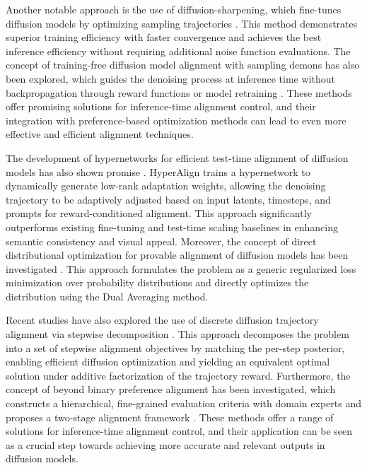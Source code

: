 \documentclass[11pt,a4paper]{article}
\begin{document}
Another notable approach is the use of diffusion-sharpening, which fine-tunes diffusion models by optimizing sampling trajectories \cite{arxiv:2502.12146}. This method demonstrates superior training efficiency with faster convergence and achieves the best inference efficiency without requiring additional noise function evaluations. The concept of training-free diffusion model alignment with sampling demons has also been explored, which guides the denoising process at inference time without backpropagation through reward functions or model retraining \cite{arxiv:2410.05760}. These methods offer promising solutions for inference-time alignment control, and their integration with preference-based optimization methods can lead to even more effective and efficient alignment techniques.

The development of hypernetworks for efficient test-time alignment of diffusion models has also shown promise \cite{arxiv:2601.15968}. HyperAlign trains a hypernetwork to dynamically generate low-rank adaptation weights, allowing the denoising trajectory to be adaptively adjusted based on input latents, timesteps, and prompts for reward-conditioned alignment. This approach significantly outperforms existing fine-tuning and test-time scaling baselines in enhancing semantic consistency and visual appeal. Moreover, the concept of direct distributional optimization for provable alignment of diffusion models has been investigated \cite{arxiv:2502.02954}. This approach formulates the problem as a generic regularized loss minimization over probability distributions and directly optimizes the distribution using the Dual Averaging method.

Recent studies have also explored the use of discrete diffusion trajectory alignment via stepwise decomposition \cite{arxiv:2507.04832}. This approach decomposes the problem into a set of stepwise alignment objectives by matching the per-step posterior, enabling efficient diffusion optimization and yielding an equivalent optimal solution under additive factorization of the trajectory reward. Furthermore, the concept of beyond binary preference alignment has been investigated, which constructs a hierarchical, fine-grained evaluation criteria with domain experts and proposes a two-stage alignment framework \cite{arxiv:2601.04300}. These methods offer a range of solutions for inference-time alignment control, and their application can be seen as a crucial step towards achieving more accurate and relevant outputs in diffusion models.
\end{document}

